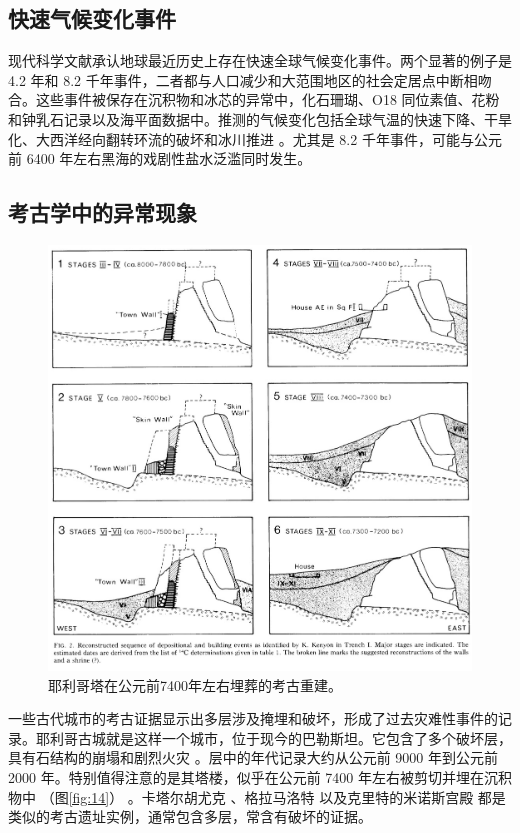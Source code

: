 \documentclass[10pt,twocolumn,letterpaper]{article}
\begin{document}
\subsection{快速气候变化事件}

现代科学文献承认地球最近历史上存在快速全球气候变化事件。两个显著的例子是 4.2 年和 8.2 千年事件，二者都与人口减少和大范围地区的社会定居点中断相吻合。这些事件被保存在沉积物和冰芯的异常中，化石珊瑚、O18 同位素值、花粉和钟乳石记录以及海平面数据中。推测的气候变化包括全球气温的快速下降、干旱化、大西洋经向翻转环流的破坏和冰川推进 \cite{90,91,92}。尤其是 8.2 千年事件，可能与公元前 6400 年左右黑海的戏剧性盐水泛滥同时发生\cite{93}。

\subsection{考古学中的异常现象}

\begin{figure}[t]
\begin{center}
   \includegraphics[width=1\linewidth]{jericho.jpg}
\end{center}
   \caption{耶利哥塔在公元前7400年左右埋葬的考古重建\cite{95}。}
\label{fig:14}
\label{fig:onecol}
\end{figure}

一些古代城市的考古证据显示出多层涉及掩埋和破坏，形成了过去灾难性事件的记录。耶利哥古城就是这样一个城市，位于现今的巴勒斯坦。它包含了多个破坏层，具有石结构的崩塌和剧烈火灾 \cite{96,97}。层中的年代记录大约从公元前 9000 年到公元前 2000 年。特别值得注意的是其塔楼，似乎在公元前 7400 年左右被剪切并埋在沉积物中 （图\ref{fig:14}） \cite{95}。卡塔尔胡尤克 \cite{99}、格拉马洛特 \cite{98} 以及克里特的米诺斯宫殿 \cite{100,101} 都是类似的考古遗址实例，通常包含多层，常含有破坏的证据。
\end{document}
